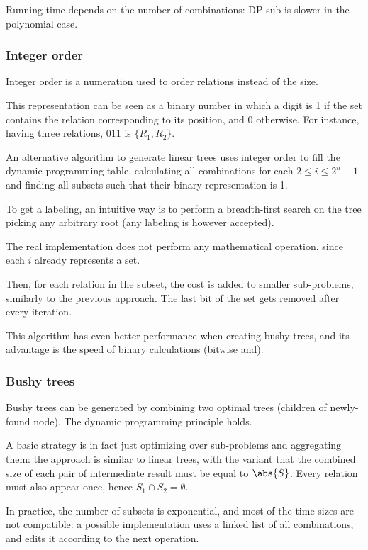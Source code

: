 Running time depends on the number of combinations: DP-sub is slower in the polynomial case.

\subsubsection{Integer order}
Integer order is a numeration used to order relations instead of the size.

This representation can be seen as a binary number in which a digit is 1 if the set contains the relation corresponding to its position, and 0 otherwise. For instance, having three relations, $011$ is $\{R_1, R_2\}$.

An alternative algorithm to generate linear trees uses integer order to fill the dynamic programming table, calculating all combinations for each $2 \leq i \leq 2^n-1$ and finding all subsets such that their binary representation is 1.

To get a labeling, an intuitive way is to perform a breadth-first search on the tree picking any arbitrary root (any labeling is however accepted).

The real implementation does not perform any mathematical operation, since each $i$ already represents a set. 

Then, for each relation in the subset, the cost is added to smaller sub-problems, similarly to the previous approach. The last bit of the set gets removed after every iteration.

This algorithm has even better performance when creating bushy trees, and its advantage is the speed of binary calculations (bitwise and). 

\subsubsection{Bushy trees}
Bushy trees can be generated by combining two optimal trees (children of newly-found node). The dynamic programming principle holds.

A basic strategy is in fact just optimizing over sub-problems and aggregating them: the approach is similar to linear trees, with the variant that the combined size of each pair of intermediate result must be equal to $\abs{S}$. Every relation must also appear once, hence $S_1 \cap S_2 = \emptyset$.

In practice, the number of subsets is exponential, and most of the time sizes are not compatible: a possible implementation uses a linked list of all combinations, and edits it according to the next operation.


